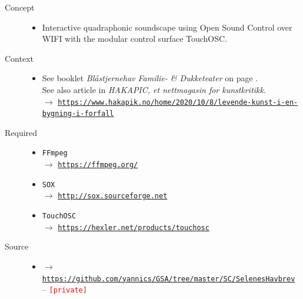 \begin{description}
\item[Concept] \hfill 
\begin{itemize}
\item[] Interactive quadraphonic soundscape using Open Sound Control over WIFI with the modular control surface TouchOSC.
\end{itemize}

\item[Context] \hfill 
\begin{itemize}
\item[] 
See booklet \textsl{Bl\aa stjernehav Familie- \& Dukketeater} on page \pageref{psh}.\\
See also article in \textsl{HAKAPIC, et nettmagasin for kunstkritikk}.\\
$\rightarrow$ \href{https://www.hakapik.no/home/2020/10/8/levende-kunst-i-en-bygning-i-forfall}{\texttt{\scriptsize https://www.hakapik.no/home/2020/10/8/levende-kunst-i-en-bygning-i-forfall}}

\end{itemize}

\item[Required] \hfill 
\begin{itemize}
\setlength\itemsep{1em}
\item[] \texttt{FFmpeg} \\ $\rightarrow$ \href{https://ffmpeg.org/}{\texttt{\small https://ffmpeg.org/}}
\item[] \texttt{SOX} \\ $\rightarrow$ \href{http://sox.sourceforge.net/}{\texttt{\small http://sox.sourceforge.net}}
\item[] \texttt{TouchOSC} \\ $\rightarrow$ \href{https://hexler.net/products/touchosc}{\texttt{\small https://hexler.net/products/touchosc}}
\end{itemize}

\item[Source] \hfill 
\begin{itemize}
\item[] $\rightarrow$ \href{https://github.com/yannics/GSA/tree/master/SC/SelenesHavbrev}{\texttt{\small https://github.com/yannics/GSA/tree/master/SC/SelenesHavbrev}}  -- \texttt{\textcolor{red}{\small[private]}}
\end{itemize}


\end{description}

